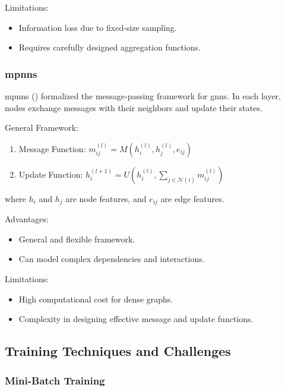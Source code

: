 Limitations:
\begin{itemize}
    \item Information loss due to fixed-size sampling.
    \item Requires carefully designed aggregation functions.
\end{itemize}


\subsubsection*{\glspl{mpnn}}

\glspl{mpnn} (\cite{Gilmer2017}) formalized the message-passing framework for \glspl{gnn}. In each layer, nodes exchange messages with their neighbors and update their states.

General Framework:

\begin{enumerate}
    \item Message Function: \( m_{ij}^{(l)} = M(h_i^{(l)}, h_j^{(l)}, e_{ij}) \)
    \item Update Function: \( h_i^{(l+1)} = U\left(h_i^{(l)}, \sum_{j \in \mathcal{N}(i)} m_{ij}^{(l)}\right) \)
\end{enumerate}

where \( h_i \) and \( h_j \) are node features, and \( e_{ij} \) are edge features.

Advantages:
\begin{itemize}
    \item General and flexible framework.
    \item Can model complex dependencies and interactions.
\end{itemize}


Limitations:
\begin{itemize}
    \item High computational cost for dense graphs.
    \item Complexity in designing effective message and update functions.
\end{itemize}

\subsection*{Training Techniques and Challenges}

\subsubsection*{Mini-Batch Training}

